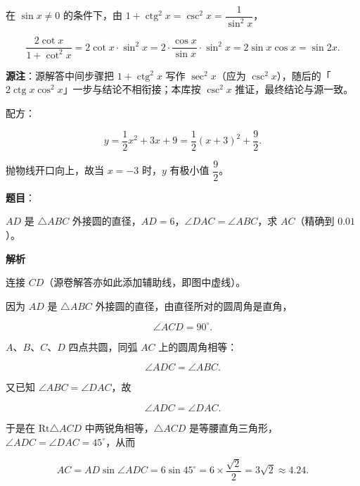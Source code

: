 \begin{answer}

在 $\sin x\ne 0$ 的条件下，由 $1+\operatorname{ctg}^{2}x=\csc^{2}x=\dfrac{1}{\sin^{2}x}$，

\nopagebreak[4]
\[
\frac{2\cot x}{1+\cot^{2}x}
=2\cot x\cdot\sin^{2}x
=2\cdot\frac{\cos x}{\sin x}\cdot\sin^{2}x
=2\sin x\cos x
=\sin 2x.
\]

\begin{gktip}
\textbf{源注}：源解答中间步骤把 $1+\operatorname{ctg}^{2}x$ 写作 $\sec^{2}x$（应为 $\csc^{2}x$），随后的「$2\operatorname{ctg}x\cos^{2}x$」一步与结论不相衔接；本库按 $\csc^{2}x$ 推证，最终结论与源一致。
\end{gktip}


配方：

\nopagebreak[4]
\[
y=\frac{1}{2}x^{2}+3x+9=\frac{1}{2}(x+3)^{2}+\frac{9}{2}.
\]

抛物线开口向上，故当 $x=-3$ 时，$y$ 有极小值 $\dfrac{9}{2}$。





\end{answer}
\begin{answer}

\textbf{题目}：

$AD$ 是 $\triangle ABC$ 外接圆的直径，$AD=6$，$\angle DAC=\angle ABC$，求 $AC$（精确到 $0.01$）。
\nopagebreak[4]
\begin{center}\end{center}
\nopagebreak[4]
\textbf{解析}

连接 $CD$（源卷解答亦如此添加辅助线，即图中虚线）。
\nopagebreak[4]
\begin{center}\end{center}
\nopagebreak[4]
因为 $AD$ 是 $\triangle ABC$ 外接圆的直径，由直径所对的圆周角是直角，

\nopagebreak[4]
\[
\angle ACD=90^\circ.
\]

$A\text{、}B\text{、}C\text{、}D$ 四点共圆，同弧 $AC$ 上的圆周角相等：

\nopagebreak[4]
\[
\angle ADC=\angle ABC.
\]

又已知 $\angle ABC=\angle DAC$，故

\nopagebreak[4]
\[
\angle ADC=\angle DAC.
\]

于是在 $\mathrm{Rt}\triangle ACD$ 中两锐角相等，$\triangle ACD$ 是等腰直角三角形，$\angle ADC=\angle DAC=45^\circ$，从而

\nopagebreak[4]
\[
AC=AD\sin\angle ADC=6\sin 45^\circ
=6\times\frac{\sqrt{2}}{2}=3\sqrt{2}\approx 4.24.
\]


\end{answer}
